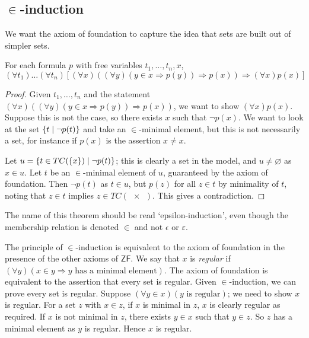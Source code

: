 \subsection{\texorpdfstring{\( \in \)}{∈}-induction}
We want the axiom of foundation to capture the idea that sets are built out of simpler sets.
\begin{theorem}
    For each formula \( p \) with free variables \( t_1, \dots, t_n, x \),
    \[ (\forall t_1)\dots(\forall t_n)[(\forall x)((\forall y)(y \in x \Rightarrow p(y)) \Rightarrow p(x)) \Rightarrow (\forall x)p(x)] \]
\end{theorem}
\begin{proof}
    Given \( t_1, \dots, t_n \) and the statement \( (\forall x)((\forall y)(y \in x \Rightarrow p(y)) \Rightarrow p(x)) \), we want to show \( (\forall x)p(x) \).
    Suppose this is not the case, so there exists \( x \) such that \( \neg p(x) \).
    We want to look at the set \( \qty{t \mid \neg p(t)} \) and take an \( \in \)-minimal element, but this is not necessarily a set, for instance if \( p(x) \) is the assertion \( x \neq x \).

    Let \( u = \qty{t \in TC(\qty{x}) \mid \neg p(t)} \); this is clearly a set in the model, and \( u \neq \varnothing \) as \( x \in u \).
    Let \( t \) be an \( \in \)-minimal element of \( u \), guaranteed by the axiom of foundation.
    Then \( \neg p(t) \) as \( t \in u \), but \( p(z) \) for all \( z \in t \) by minimality of \( t \), noting that \( z \in t \) implies \( z \in TC(\qty{x}) \).
    This gives a contradiction.
\end{proof}
The name of this theorem should be read `epsilon-induction', even though the membership relation is denoted \( \in \) and not \( \epsilon \) or \( \varepsilon \).

The principle of \( \in \)-induction is equivalent to the axiom of foundation in the presence of the other axioms of \( \mathsf{ZF} \).
We say that \( x \) is \emph{regular} if \( (\forall y)(x \in y \Rightarrow y \text{ has a minimal element}) \).
The axiom of foundation is equivalent to the assertion that every set is regular.
Given \( \in \)-induction, we can prove every set is regular.
Suppose \( (\forall y \in x)(y \text{ is regular}) \); we need to show \( x \) is regular.
For a set \( z \) with \( x \in z \), if \( x \) is minimal in \( z \), \( x \) is clearly regular as required.
If \( x \) is not minimal in \( z \), there exists \( y \in x \) such that \( y \in z \).
So \( z \) has a minimal element as \( y \) is regular.
Hence \( x \) is regular.


